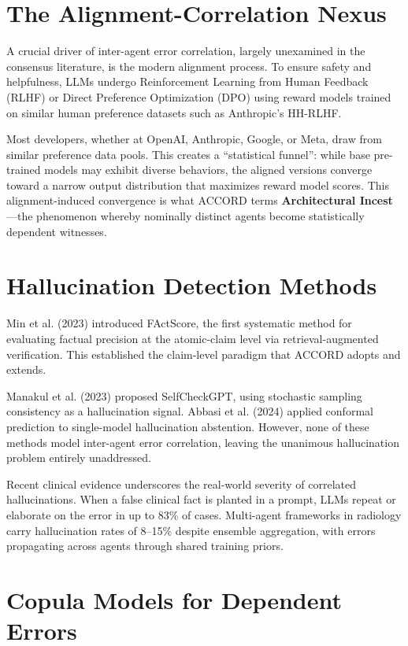 \documentclass[12pt,a4paper]{report}
\begin{document}
\section{The Alignment-Correlation Nexus}

A crucial driver of inter-agent error correlation, largely unexamined in the consensus literature, is the modern alignment process. To ensure safety and helpfulness, LLMs undergo Reinforcement Learning from Human Feedback (RLHF) or Direct Preference Optimization (DPO) using reward models trained on similar human preference datasets such as Anthropic's HH-RLHF.

Most developers, whether at OpenAI, Anthropic, Google, or Meta, draw from similar preference data pools. This creates a ``statistical funnel'': while base pre-trained models may exhibit diverse behaviors, the aligned versions converge toward a narrow output distribution that maximizes reward model scores. This alignment-induced convergence is what ACCORD terms \textbf{Architectural Incest}---the phenomenon whereby nominally distinct agents become statistically dependent witnesses.

\section{Hallucination Detection Methods}

Min et al. (2023) introduced FActScore, the first systematic method for evaluating factual precision at the atomic-claim level via retrieval-augmented verification. This established the claim-level paradigm that ACCORD adopts and extends.

Manakul et al. (2023) proposed SelfCheckGPT, using stochastic sampling consistency as a hallucination signal. Abbasi et al. (2024) applied conformal prediction to single-model hallucination abstention. However, none of these methods model inter-agent error correlation, leaving the unanimous hallucination problem entirely unaddressed.

Recent clinical evidence underscores the real-world severity of correlated hallucinations. When a false clinical fact is planted in a prompt, LLMs repeat or elaborate on the error in up to 83\% of cases. Multi-agent frameworks in radiology carry hallucination rates of 8--15\% despite ensemble aggregation, with errors propagating across agents through shared training priors.

\section{Copula Models for Dependent Errors}
\end{document}
